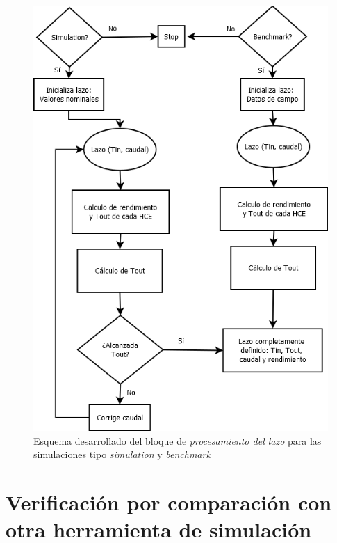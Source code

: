 \begin{figure}[H]
\includegraphics[width=0.80\linewidth]{images/flujo2.png}
\caption{Esquema desarrollado del bloque  de \emph{procesamiento del lazo} para las simulaciones tipo \emph{simulation} y \emph{benchmark}} 
\label{fig:flujo2}
\end{figure}

\section{Verificación por comparación con otra herramienta de simulación}

